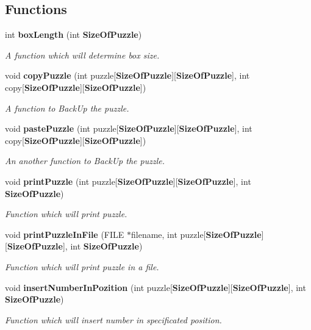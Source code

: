 \subsection*{Functions}
\begin{DoxyCompactItemize}
\item 
int {\bf box\+Length} (int {\bf Size\+Of\+Puzzle})
\begin{DoxyCompactList}\small\item\em A function which will determine box size. \end{DoxyCompactList}\item 
void {\bf copy\+Puzzle} (int puzzle[{\bf Size\+Of\+Puzzle}][{\bf Size\+Of\+Puzzle}], int copy[{\bf Size\+Of\+Puzzle}][{\bf Size\+Of\+Puzzle}])
\begin{DoxyCompactList}\small\item\em A function to Back\+Up the puzzle. \end{DoxyCompactList}\item 
void {\bf paste\+Puzzle} (int puzzle[{\bf Size\+Of\+Puzzle}][{\bf Size\+Of\+Puzzle}], int copy[{\bf Size\+Of\+Puzzle}][{\bf Size\+Of\+Puzzle}])
\begin{DoxyCompactList}\small\item\em An another function to Back\+Up the puzzle. \end{DoxyCompactList}\item 
void {\bf print\+Puzzle} (int puzzle[{\bf Size\+Of\+Puzzle}][{\bf Size\+Of\+Puzzle}], int {\bf Size\+Of\+Puzzle})
\begin{DoxyCompactList}\small\item\em Function which will print puzzle. \end{DoxyCompactList}\item 
void {\bf print\+Puzzle\+In\+File} (F\+I\+LE $\ast$filename, int puzzle[{\bf Size\+Of\+Puzzle}][{\bf Size\+Of\+Puzzle}], int {\bf Size\+Of\+Puzzle})
\begin{DoxyCompactList}\small\item\em Function which will print puzzle in a file. \end{DoxyCompactList}\item 
void {\bf insert\+Number\+In\+Pozition} (int puzzle[{\bf Size\+Of\+Puzzle}][{\bf Size\+Of\+Puzzle}], int {\bf Size\+Of\+Puzzle})
\begin{DoxyCompactList}\small\item\em Function which will insert number in specificated position. \end{DoxyCompactList}\item 

\end{DoxyCompactItemize}
